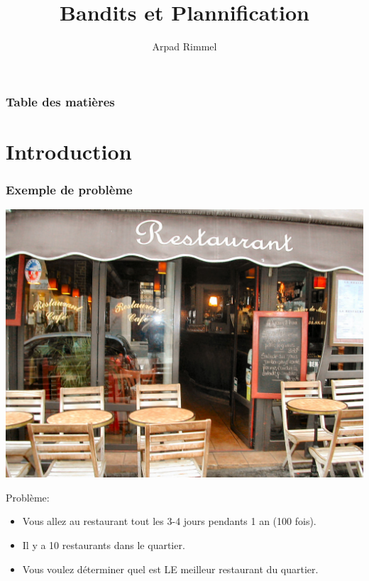 \documentclass{beamer}
\begin{document}
\title{Bandits et Plannification}

\author{Arpad Rimmel}



\begin{frame}
    \titlepage
\end{frame}

\begin{frame}
    \frametitle{Table des matières}
    \tableofcontents[]
\end{frame}


\section*{Introduction}

\begin{frame}
    \frametitle{Exemple de problème}
    \begin{center}
        \includegraphics[scale=0.05]{restau.jpg}
    \end{center}
    Problème:
    \begin{itemize}
        \item Vous allez au restaurant tout les 3-4 jours  pendants 1 an (100 fois).
        \item Il y a 10 restaurants dans le quartier.
        \item Vous voulez déterminer quel est LE meilleur restaurant du quartier.
    \end{itemize}
\end{frame}
\end{document}
